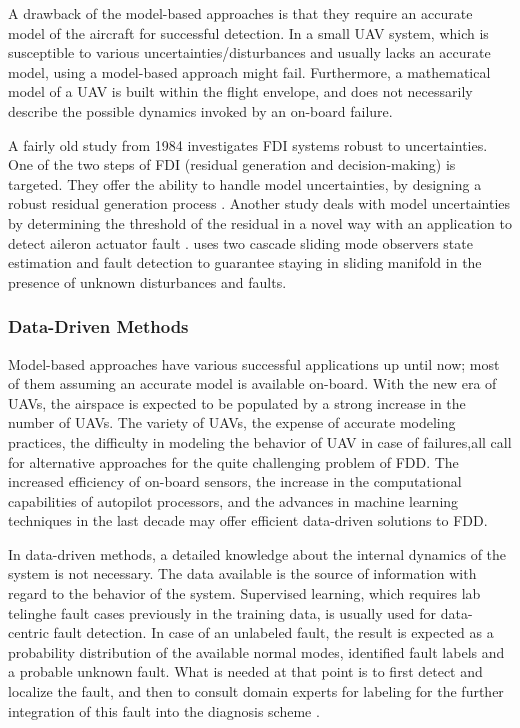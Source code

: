 A drawback of the model-based approaches is that they require an accurate model of the 
aircraft for successful detection. In a small UAV system, which is susceptible to various 
uncertainties/disturbances and usually lacks an accurate model, using a model-based approach might fail. 
Furthermore, a mathematical model of a UAV 
is built within the flight envelope, and does not necessarily describe the 
possible dynamics invoked by an on-board failure. 

A fairly old study from 1984 investigates FDI systems robust to 
uncertainties. One of the two steps of FDI (residual generation and decision-making) is targeted. They offer the ability to handle model uncertainties, by designing a robust residual generation process \cite{chow1984analytical}. 
Another study deals with model uncertainties by determining the threshold of the residual 
in a novel way with an application to detect aileron actuator fault \cite{rotstein2006fault}. 
\cite{sharma2007fault} uses two cascade sliding mode observers state estimation and 
fault detection to guarantee staying in sliding manifold in the presence of unknown 
disturbances and faults. 
%

\subsubsection{Data-Driven Methods}

Model-based approaches have various successful applications up until now; 
most of them assuming an accurate model is available on-board. With the new 
era of UAVs, the airspace is expected to be populated by a strong increase 
in the number of UAVs. The variety of UAVs, the expense of accurate modeling 
practices, the difficulty in modeling the behavior of UAV in case of failures,all 
call for alternative approaches for the quite challenging problem of FDD. 
The increased efficiency of on-board sensors, the increase in the computational 
capabilities of autopilot processors, and the advances in machine learning 
techniques in the last decade may offer efficient data-driven solutions to FDD.

In data-driven methods, a detailed knowledge about the internal dynamics 
of the system is not necessary. The data available is the source of information 
with regard to the behavior of the system. Supervised learning, which requires 
lab telinghe fault cases previously in the training data, is usually used for 
data-centric fault detection. In case of an unlabeled fault, the result is 
expected as a probability distribution of the available normal modes, identified 
fault labels and a probable unknown fault. What is needed at that point is to 
first detect and localize the fault, and then to consult domain experts for labeling 
for the further integration of this fault into the diagnosis scheme \cite{dataCentricDiagOffline}.

